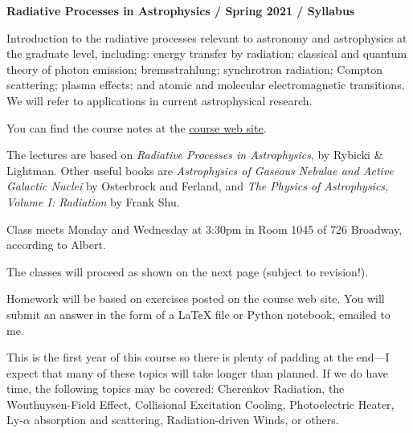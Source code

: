 \documentclass[11pt]{article}
\begin{document}
\begin{center}
  {\bf Radiative Processes in Astrophysics / Spring 2021 / Syllabus }
\end{center}


\noindent Introduction to the radiative processes relevant to astronomy and
astrophysics at the graduate level, including: energy transfer by
radiation; classical and quantum theory of photon emission;
bremsstrahlung; synchrotron radiation; Compton scattering; plasma
effects; and atomic and molecular electromagnetic transitions.  We
will refer to applications in current astrophysical research.

\noindent You can find the course notes at the
\href{http://blanton144.github.io/radiative}{course web site}. 

\noindent The lectures are based on {\it Radiative Processes in
  Astrophysics}, by Rybicki \& Lightman. Other useful books are {\it
  Astrophysics of Gaseous Nebulae and Active Galactic Nuclei} by
Osterbrock and Ferland, and {\it The Physics of Astrophysics, Volume
  I: Radiation} by Frank Shu. 

\noindent Class meets Monday and Wednesday at 3:30pm in Room 1045 of
726 Broadway, according to Albert.

\noindent The classes will proceed as shown on the next page (subject
to revision!).

\noindent 
Homework will be based on exercises posted on the course web site.
You will submit an answer in the form of a LaTeX file or Python
notebook, emailed to me.

\noindent 
This is the first year of this course so there is plenty of padding at
the end---I expect that many of these topics will take longer than
planned. If we do have time, the following topics may be covered:
Cherenkov Radiation, the Wouthuysen-Field Effect, Collisional
Excitation Cooling, Photoelectric Heater, Ly-$\alpha$ absorption and
scattering, Radiation-driven Winds, or others.
\end{document}
